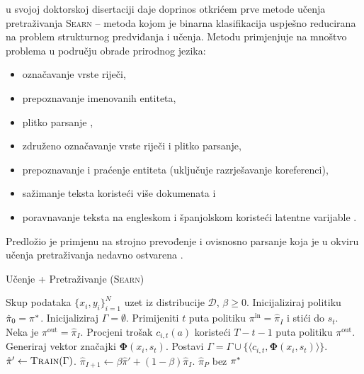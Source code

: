 \citet{daume06thesis} u svojoj doktorskoj disertaciji daje doprinos otkrićem
prve metode učenja pretraživanja \textsc{Searn}  --
metoda kojom je binarna klasifikacija uspješno reducirana na problem strukturnog
predviđanja i učenja.
Metodu primjenjuje na mnoštvo problema u području obrade prirodnog jezika:
\begin{itemize}
  \item označavanje vrste riječi,
  \item prepoznavanje imenovanih entiteta,
  \item plitko parsanje ,
  \item združeno označavanje vrste riječi i plitko parsanje,
  \item prepoznavanje i praćenje entiteta (uključuje razrješavanje koreferenci),
  \item sažimanje teksta koristeći više dokumenata i
  \item poravnavanje teksta na engleskom i španjolskom koristeći latentne
  varijable .
\end{itemize}
Predložio je primjenu na strojno prevođenje i ovisnosno parsanje koja je u
okviru učenja pretraživanja nedavno ostvarena
\citep{he2015syntax,chang2015learning}.

\begin{algorithm}
\caption{Učenje + Pretraživanje (\textsc{Searn})}\label{alg:searn}
\begin{algorithmic}[1]
\Require Skup podataka $\{x_i, y_i\}_{i=1}^N$ uzet iz distribucije $\mathcal{D}$,
  $\beta \geq 0$. %
\State Inicijaliziraj politiku $\hat{\pi}_0 = \pi\ssymbol{1}$.
\ForAll{$I \in \big[0,1,2,\ldots,P)$}
    \State Inicijaliziraj $\Gamma = \emptyset$. 
      \State Primijeniti $t$ puta politiku $\pi^{\text{in}} = \hat{\pi}_{I}$  i stići do $s_t$. 
      \label{alg:searn:action}
        \State Neka je  $\pi^{\text{out}} = \hat{\pi}_{I}$.\label{alg:searn:rolloutpolicy}
        \State Procjeni trošak $c_{i,t}(a)$ koristeći $T-t-1$ puta politiku $\pi^{\text{out}}$. \label{alg:searn:rollout}
      \EndFor
      \State Generiraj vektor značajki $\mathbf{\Phi}(x_i, s_t)$.
      \State Postavi $\Gamma = \Gamma \cup \{\langle c_{i,t}, \mathbf{\Phi}(x_i, s_t) \rangle\}$.
    \EndFor
  \EndFor
  \State $\hat{\pi}' \gets \textsc{Train}(\Gamma)$.\label{alg:searn:train}
  \State $\hat{\pi}_{I+1} \gets \beta \hat{\pi}' + (1-\beta) \hat{\pi}_{I}$. \label{alg:searn:mixture}
\EndFor
\State \Return $\hat{\pi}_{P}$ bez $\pi\ssymbol{1}$
\end{algorithmic}
\end{algorithm}

